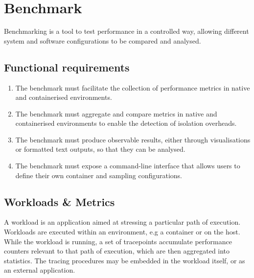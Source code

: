 
\section{Benchmark}
Benchmarking is a tool to test performance in a controlled way, allowing different 
system and software configurations to be compared and analysed.

\subsection{Functional requirements}
\begin{enumerate}[i]
    \item The benchmark must facilitate the collection of performance metrics in native and containerised environments.
    \label{requirements:functional/benchmark/1} 
    \item The benchmark must aggregate and compare metrics in native and containerised environments to 
    enable the detection of isolation overheads.
    \label{requirements:functional/benchmark/2}
    \item The benchmark must produce observable results, either through visualisations or formatted text outputs,
    so that they can be analysed.
    \label{requirements:functional/benchmark/3}
    \item The benchmark must expose a command-line interface that allows users to define their own 
    container and sampling configurations.
    \label{requirements:functional/benchmark/4}
\end{enumerate}

\subsection{Workloads \& Metrics}
A workload is an application aimed at stressing a particular path of execution. 
Workloads are executed within an environment, e.g a container or on the host.
While the workload is running, a set of tracepoints accumulate performance counters relevant to that 
path of execution, which are then aggregated into statistics. 
The tracing procedures may be embedded in the workload itself, or as an external application. 


